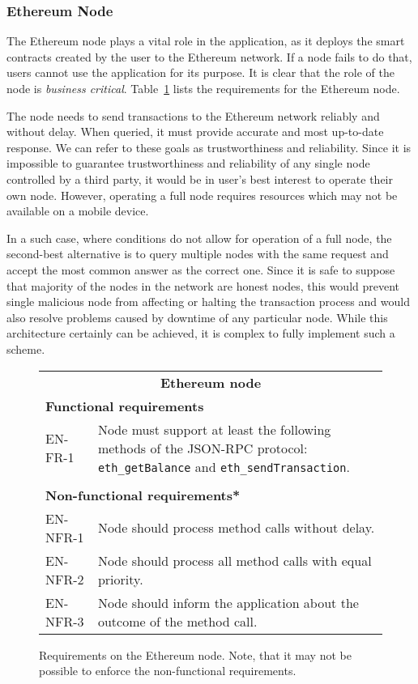 \subsubsection{Ethereum Node}
The Ethereum node plays a vital role in the application, as it deploys the smart contracts created by the user to the Ethereum network. If a node fails to do that, users cannot use the application for its purpose. It is clear that the role of the node is \textit{business critical}. Table~\ref{fig:reqs-node} lists the requirements for the Ethereum node.

The node needs to send transactions to the Ethereum network reliably and without delay. When queried, it must provide accurate and most up-to-date response. We can refer to these goals as trustworthiness and reliability. Since it is impossible to guarantee trustworthiness and reliability of any single node controlled by a third party, it would be in user’s best interest to operate their own node. However, operating a full node requires resources which may not be available on a mobile device.

In a such case, where conditions do not allow for operation of a full node, the second-best alternative is to query multiple nodes with the same request and accept the most common answer as the correct one. Since it is safe to suppose that majority of the nodes in the network are honest nodes, this would prevent single malicious node from affecting or halting the transaction process and would also resolve problems caused by downtime of any particular node. While this architecture certainly can be achieved, it is complex to fully implement such a scheme. 

\begin{figure}[ht]
    \centering
    \begin{tabularx}{\textwidth}{|l X|}
        \hline
        \multicolumn{2}{|c|}{\textbf{Ethereum node}}\\
        \multicolumn{2}{|l|}{\textbf{Functional requirements}}\\
        EN-FR-1&Node must support at least the following methods of the JSON-RPC protocol: \texttt{eth\_getBalance} and \texttt{eth\_sendTransaction}.\\
        &\\
        \multicolumn{2}{|l|}{\textbf{Non-functional requirements*}}\\
        EN-NFR-1&Node should process method calls without delay.\\
        EN-NFR-2&Node should process all method calls with equal priority.\\
        EN-NFR-3&Node should inform the application about the outcome of the method call.\\
        \hline
    \end{tabularx}
    \caption{Requirements on the Ethereum node. Note, that it may not be possible to enforce the non-functional requirements.}
    \label{fig:reqs-node}
\end{figure}

